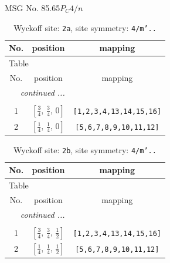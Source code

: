\documentclass[fleqn,8pt]{jsarticle}
\begin{document}
\setcounter{MaxMatrixCols}{32}

\renewcommand{\tablename}{Table~}
\renewcommand{\figurename}{Figure~}
\begin{center}
\LARGE
MSG No. 85.65\quad$P_{C}4/n$
\end{center}
\renewcommand{\arraystretch}{1.2}
\begin{longtable}{ccc}
\caption{Wyckoff site: {\tt 2a}, site symmetry: {\tt 4/m'..}}
 \\
 \hline \hline
No. & position & mapping \\ \hline \endfirsthead

\multicolumn{2}{l}{\tablename\ \thetable{}} \\
 \hline \hline
No. & position & mapping \\ \hline \endhead

 \hline \hline
\multicolumn{2}{r}{\footnotesize\it continued ...} \\ \endfoot

 \hline \hline
\multicolumn{2}{r}{} \\ \endlastfoot

1 & $\left[ \frac{3}{4},\, \frac{3}{4},\, 0 \right]$ & {\tt [1,2,3,4,13,14,15,16]} \\ \hline
2 & $\left[ \frac{1}{4},\, \frac{1}{4},\, 0 \right]$ & {\tt [5,6,7,8,9,10,11,12]} \\
\end{longtable}
\renewcommand{\arraystretch}{1.2}
\begin{longtable}{ccc}
\caption{Wyckoff site: {\tt 2b}, site symmetry: {\tt 4/m'..}}
 \\
 \hline \hline
No. & position & mapping \\ \hline \endfirsthead

\multicolumn{2}{l}{\tablename\ \thetable{}} \\
 \hline \hline
No. & position & mapping \\ \hline \endhead

 \hline \hline
\multicolumn{2}{r}{\footnotesize\it continued ...} \\ \endfoot

 \hline \hline
\multicolumn{2}{r}{} \\ \endlastfoot

1 & $\left[ \frac{3}{4},\, \frac{3}{4},\, \frac{1}{2} \right]$ & {\tt [1,2,3,4,13,14,15,16]} \\ \hline
2 & $\left[ \frac{1}{4},\, \frac{1}{4},\, \frac{1}{2} \right]$ & {\tt [5,6,7,8,9,10,11,12]} \\
\end{longtable}
\end{document}
